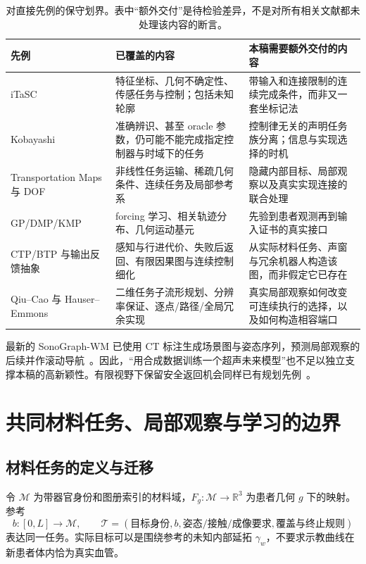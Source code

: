 \documentclass[11pt,a4paper]{article}
\theoremstyle{cn}
\newcommand{\R}{\mathbb R}
\begin{document}
\begin{table}[htbp]
\centering\small
\begin{tabularx}{\linewidth}{@{}p{.22\linewidth}XX@{}}
\toprule
先例 & 已覆盖的内容 & 本稿需要额外交付的内容\\
\midrule
iTaSC~\cite{itasc} & 特征坐标、几何不确定性、传感任务与控制；包括未知轮廓 & 带输入和连接限制的连续完成条件，而非又一套坐标记法\\
Kobayashi~\cite{kobayashi} & 准确辨识、甚至 oracle 参数，仍可能不能完成指定控制器与时域下的任务 & 控制律无关的声明任务族分离；信息与实现选择的时机\\
Transportation Maps 与 DOF~\cite{transport,dof} & 非线性任务运输、稀疏几何条件、连续任务及局部参考系 & 隐藏内部目标、局部观察以及真实实现连接的联合处理\\
GP/DMP/KMP~\cite{gpdmp,prodmp,gdmp,kmp} & forcing 学习、相关轨迹分布、几何运动基元 & 先验到患者观测再到输入证书的真实接口\\
CTP/BTP 与输出反馈抽象~\cite{ctp,btp,output} & 感知与行进代价、失败后返回、有限因果图与连续控制细化 & 从实际材料任务、声窗与冗余机器人构造该图，而非假定它已存在\\
Qiu--Cao 与 Hauser--Emmons~\cite{qiu,hauser} & 二维任务子流形规划、分辨率保证、逐点/路径/全局冗余实现 & 真实局部观察如何改变可连续执行的选择，以及如何构造相容端口\\
\bottomrule
\end{tabularx}
\caption{对直接先例的保守划界。表中“额外交付”是待检验差异，不是对所有相关文献都未处理该内容的断言。}
\end{table}

最新的 SonoGraph-WM 已使用 CT 标注生成场景图与姿态序列，预测局部观察的后续并作滚动导航~\cite{sonograph}。因此，“用合成数据训练一个超声未来模型”也不足以独立支撑本稿的高新颖性。有限视野下保留安全返回机会同样已有规划先例~\cite{rtd}。

\section{共同材料任务、局部观察与学习的边界}
\label{sec:model}

\subsection{材料任务的定义与迁移}

令 \(\mathcal M\) 为带器官身份和图册索引的材料域，\(F_g:\mathcal M\to\R^3\) 为患者几何 \(g\) 下的映射。参考
\[
b:[0,L]\to\mathcal M,\qquad
\mathcal T=(\text{目标身份},b,\text{姿态/接触/成像要求},\text{覆盖与终止规则})
\]
表达同一任务。实际目标可以是围绕参考的未知内部延拓 \(\gamma_w\)，不要求示教曲线在新患者体内恰为真实血管。
\end{document}
